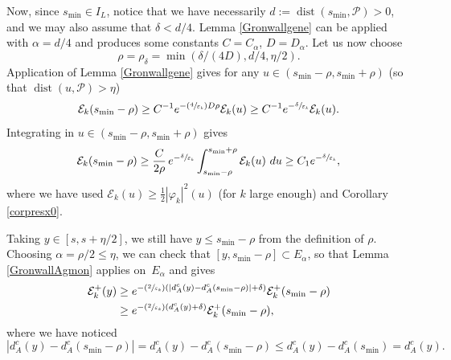 \documentclass[10pt]{amsart}
\newcommand{\Psfrac}[2]{(\sfrac{#1}{#2})}
\theoremstyle{definition}
\newcommand{\Ek}{\mathcal{E}_k}
\DeclareMathOperator{\dist}{dist}
\newcommand{\ce}{c}
\let\e\varepsilon
\begin{document}
Now, since $s_{\min} \in I_L$, notice that we have necessarily $d:=\dist(s_{\min},\mathcal{P})>0$, and we may also assume that $\delta<d/4$.
Lemma \ref{Gronwallgene} can be applied with $\alpha=d/4$ and produces some constants $C=C_{\alpha}$, $D=D_{\alpha}$. Let us now choose
\[
\rho=\rho_{\delta}=\min(\delta/(4D),d/4, \eta/2).
\]
Application of Lemma \ref{Gronwallgene} gives for any $u\in (s_{\min}-\rho,s_{\min}+\rho) $ (so that $\dist(u,\mathcal{P})>\eta$)
\[
\Ek(s_{\min}-\rho)\geq C^{-1}e^{-\Psfrac{4}{\e_k}D\rho}\Ek(u)\geq C^{-1}e^{-\sfrac{\delta}{\e_k}}\Ek(u).
\]
Integrating in $u\in (s_{\min}-\rho,s_{\min}+\rho) $ gives
\begin{equation}
\label{inegEk}
\Ek(s_{\min}-\rho)\geq \frac{C}{2\rho}\,e^{-\sfrac{\delta}{\e_k}}\int_{s_{\min}-\rho}^{s_{\min}+\rho} \Ek(u)~du \geq C_1e^{-\sfrac{\delta}{\e_k}},
\end{equation}
where we have used $\Ek(u)\geq \frac12 |\varphi_k|^2(u)$ (for $k$ large enough) and Corollary \ref{corpresx0}.

Taking $y\in [s,s+\eta/2]$, we still have $y\leq s_{\min}-\rho$ from the definition of $\rho$. Choosing $\alpha=\rho/2\leq \eta$, we can check that $[y,s_{\min}-\rho]\subset E_{\alpha}$, so that Lemma \ref{GronwallAgmon} applies on~$E_{\alpha}$ and gives
\begin{equation}
\label{inegdaeta}
\begin{split}
\Ek^+(y)&\geq e^{ -\Psfrac{2}{\e_k}\left(|d_A^{\ce}(y)-d_A^{\ce}(s_{\min}-\rho)|+\delta\right)}\Ek^+(s_{\min}-\rho)\\
&\geq e^{-\Psfrac{2}{\e_k}\left(d_A^{\ce}(y)+\delta\right)}\Ek^+(s_{\min}-\rho),
\end{split}
\end{equation}
where we have noticed
\[
|d_A^{\ce}(y)-d_A^{\ce}(s_{\min}-\rho)|= d_A^{\ce}(y)-d_A^{\ce}(s_{\min}-\rho) \leq d_A^{\ce}(y)-d_A^{\ce}(s_{\min}) = d_A^{\ce}(y).
\]
\end{document}
